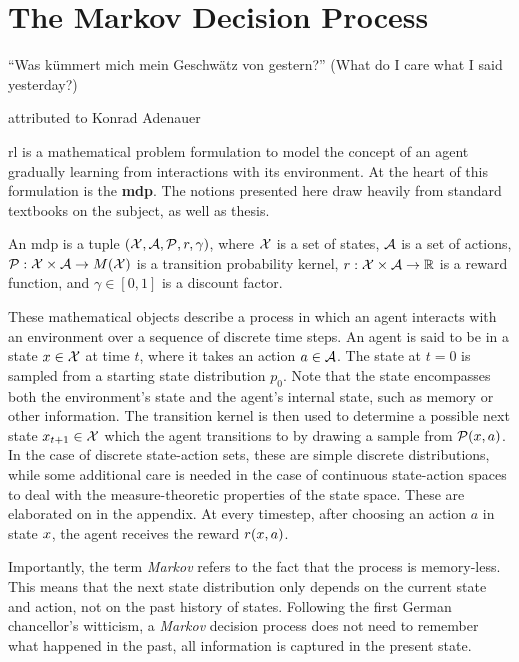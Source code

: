 \section{The Markov Decision Process}
\label{chap:background:mdp}
\epigraph{``Was kümmert mich mein Geschwätz von gestern?'' (What do I care what I said yesterday?)}{attributed to Konrad Adenauer}


\ac{rl} is a mathematical problem formulation to model the concept of an agent gradually learning from interactions with its environment.
At the heart of this formulation is the \textbf{\ac{mdp}}.
The notions presented here draw heavily from standard textbooks on the subject, as well as thesis.


\begin{definition}
An {\ac{mdp}} is a tuple $(\mathcal{X},\mathcal{A},\mathcal{P},r,\gamma)$, where $\mathcal{X}$ is a set of states, $\mathcal{A}$ is a set of actions, $\mathcal{P}: \mathcal{X} \times \mathcal{A} \rightarrow M(\mathcal{X})$ is a transition probability kernel, $r: \mathcal{X} \times \mathcal{A} \rightarrow \mathbb{R}$ is a reward function, and $\gamma \in [0,1]$ is a discount factor.
\end{definition}

These mathematical objects describe a process in which an agent interacts with an environment over a sequence of discrete time steps.
An agent is said to be in a state $x \in \mathcal{X}$ at time $t$, where it takes an action $a \in \mathcal{A}$.
The state at $t=0$ is sampled from a starting state distribution $p_0$.
Note that the state encompasses both the environment's state and the agent's internal state, such as memory or other information.
The transition kernel is then used to determine a possible next state $x_{t+1} \in \mathcal{X}$ which the agent transitions to by drawing a sample from $\mathcal{P}(x,a)$.
In the case of discrete state-action sets, these are simple discrete distributions, while some additional care is needed in the case of continuous state-action spaces to deal with the measure-theoretic properties of the state space.
These are elaborated on in the appendix.
At every timestep, after choosing an action $a$ in state $x$, the agent receives the reward $r(x,a)$.

Importantly, the term \emph{Markov} refers to the fact that the process is memory-less.
This means that the next state distribution only depends on the current state and action, not on the past history of states.
Following the first German chancellor's witticism, a \emph{Markov} decision process does not need to remember what happened in the past, all information is captured in the present state.

